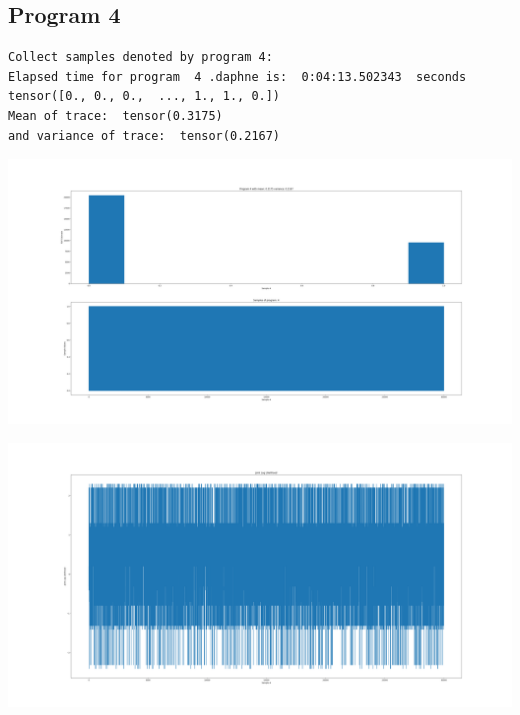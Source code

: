 \documentclass[]{article}
\begin{document}
\subsection{Program 4}
\begin{verbatim}
Collect samples denoted by program 4:
Elapsed time for program  4 .daphne is:  0:04:13.502343  seconds
tensor([0., 0., 0.,  ..., 1., 1., 0.])
Mean of trace:  tensor(0.3175)  
and variance of trace:  tensor(0.2167)
\end{verbatim}
\begin{center}
	\includegraphics[width=\linewidth]{Figures/p4_MHGibbs.png}
\end{center}
\begin{center}
	\includegraphics[width=\linewidth]{Figures/p4_MHGibbsjll.png}
\end{center}
\end{document}
